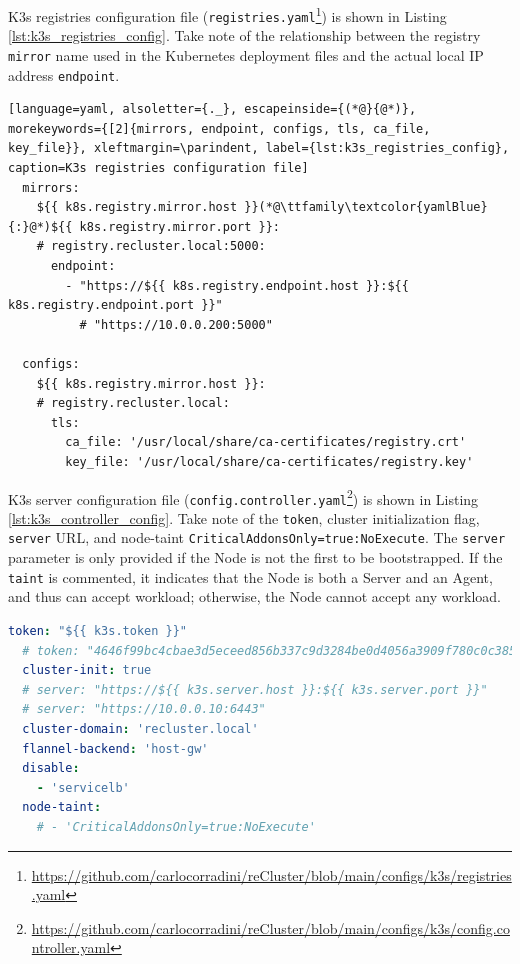 K3s registries configuration file (\texttt{registries.yaml}\footnote{\url{https://github.com/carlocorradini/reCluster/blob/main/configs/k3s/registries.yaml}})
is shown in Listing \ref{lst:k3s_registries_config}. Take note of the
relationship between the registry \texttt{mirror} name used in the Kubernetes deployment
files and the actual local IP address \texttt{endpoint}.

\begin{lstlisting}[language=yaml, alsoletter={._}, escapeinside={(*@}{@*)}, morekeywords={[2]{mirrors, endpoint, configs, tls, ca_file, key_file}}, xleftmargin=\parindent, label={lst:k3s_registries_config}, caption=K3s registries configuration file]
  mirrors:
    ${{ k8s.registry.mirror.host }}(*@\ttfamily\textcolor{yamlBlue}{:}@*)${{ k8s.registry.mirror.port }}:
    # registry.recluster.local:5000:
      endpoint:
        - "https://${{ k8s.registry.endpoint.host }}:${{ k8s.registry.endpoint.port }}"
          # "https://10.0.0.200:5000"

  configs:
    ${{ k8s.registry.mirror.host }}:
    # registry.recluster.local:
      tls:
        ca_file: '/usr/local/share/ca-certificates/registry.crt'
        key_file: '/usr/local/share/ca-certificates/registry.key'
\end{lstlisting}

K3s server configuration file (\texttt{config.controller.yaml}\footnote{\url{https://github.com/carlocorradini/reCluster/blob/main/configs/k3s/config.controller.yaml}})
is shown in Listing \ref{lst:k3s_controller_config}. Take note of the \texttt{token},
cluster initialization flag, \texttt{server} URL, and node-taint \texttt{CriticalAddonsOnly=true:NoExecute}.
The \texttt{server} parameter is only provided if the Node is not the first to be
bootstrapped. If the \texttt{taint} is commented, it indicates that the Node is
both a Server and an Agent, and thus can accept workload; otherwise, the Node cannot
accept any workload.

\begin{lstlisting}[language=yaml, alsoletter={.-}, morekeywords={[2]{token, cluster-init, cluster-domain, flannel-backend, disable, node-taint}}, xleftmargin=\parindent, label={lst:k3s_controller_config}, caption=K3s server configuration file]
  token: "${{ k3s.token }}"
  # token: "4646f99bc4cbae3d5eceed856b337c9d3284be0d4056a3909f780c0c385fbf93"
  cluster-init: true
  # server: "https://${{ k3s.server.host }}:${{ k3s.server.port }}"
  # server: "https://10.0.0.10:6443"
  cluster-domain: 'recluster.local'
  flannel-backend: 'host-gw'
  disable:
    - 'servicelb'
  node-taint:
    # - 'CriticalAddonsOnly=true:NoExecute'
\end{lstlisting}

